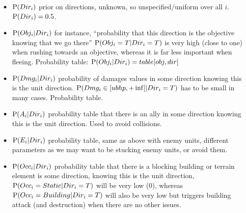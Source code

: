 \begin{itemize}
\item $\mathrm{P}(Dir_i)$ prior on directions, unknown, so unspecified/uniform over all $i$. $\mathrm{P}(Dir_i) = 0.5$.
\item $\mathrm{P}(Obj_i | Dir_i)$ for instance, ``probability that this direction is the objective knowing that we go there'' $\mathrm{P}(Obj_i = T | Dir_i = T)$ is very high (close to one) when rushing towards an objective, whereas it is far less important when fleeing. Probability table: $\mathrm{P}(Obj_i | Dir_i) = table[obj, dir]$
\item $\mathrm{P}(Dmg_i | Dir_i)$ probability of damages values in some direction knowing this is the unit direction. $\mathrm{P}(Dmg_i \in [ubhp, +\inf[ | Dir_i = T)$ has to be small in many cases. Probability table.
\item $\mathrm{P}(A_i | Dir_i)$ probability table that there is an ally in some direction knowing this is the unit direction. Used to avoid collisions.
\item $\mathrm{P}(E_i | Dir_i)$ probability table, same as above with enemy units, different parameters as we may want to be stucking enemy units, or avoid them.
\item $\mathrm{P}(Occ_i | Dir_i)$ probability table that there is a blocking building or terrain element is some direction, knowing this is the unit direction, $\mathrm{P}(Occ_i = Static | Dir_i = T)$ will be very low (0), whereas $\mathrm{P}(Occ_i = Building | Dir_i = T)$ will also be very low but triggers building attack (and destruction) when there are no other issues.
\end{itemize}

